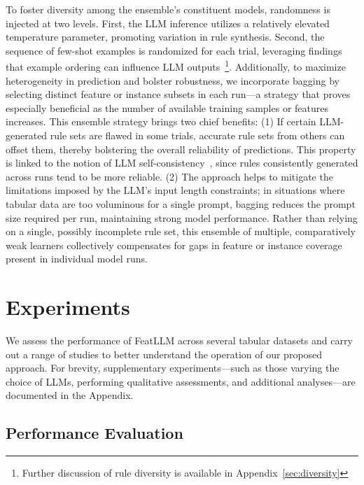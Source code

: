 To foster diversity among the ensemble's constituent models, randomness is injected at two levels. First, the LLM inference utilizes a relatively elevated temperature parameter, promoting variation in rule synthesis. Second, the sequence of few-shot examples is randomized for each trial, leveraging findings that example ordering can influence LLM outputs~\cite{lu2022fantastically}\footnote{Further discussion of rule diversity is available in Appendix~\ref{sec:diversity}}. Additionally, to maximize heterogeneity in prediction and bolster robustness, we incorporate bagging by selecting distinct feature or instance subsets in each run—a strategy that proves especially beneficial as the number of available training samples or features increases. This ensemble strategy brings two chief benefits: (1) If certain LLM-generated rule sets are flawed in some trials, accurate rule sets from others can offset them, thereby bolstering the overall reliability of predictions. This property is linked to the notion of LLM self-consistency~\cite{wang2022self}, since rules consistently generated across runs tend to be more reliable. (2) The approach helps to mitigate the limitations imposed by the LLM's input length constraints; in situations where tabular data are too voluminous for a single prompt, bagging reduces the prompt size required per run, maintaining strong model performance. Rather than relying on a single, possibly incomplete rule set, this ensemble of multiple, comparatively weak learners collectively compensates for gaps in feature or instance coverage present in individual model runs.

\section{Experiments}
We assess the performance of \textsf{FeatLLM} across several tabular datasets and carry out a range of studies to better understand the operation of our proposed approach. For brevity, supplementary experiments—such as those varying the choice of LLMs, performing qualitative assessments, and additional analyses—are documented in the Appendix.

\subsection{Performance Evaluation}
